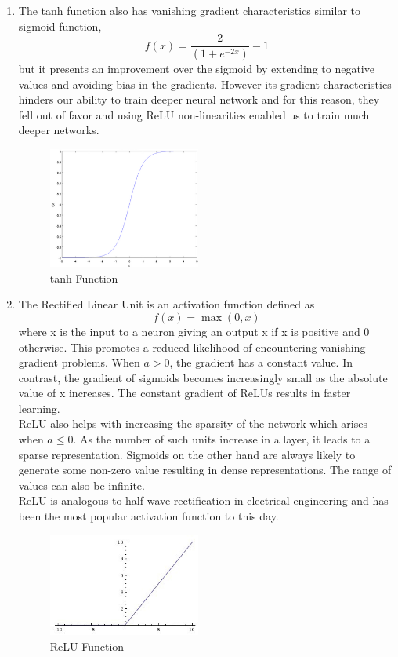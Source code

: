\begin{enumerate}[label=(\alph*)]
\item The tanh function also has vanishing gradient characteristics similar to sigmoid function,
\begin{equation}
    f(x) = \frac{2}{(1+e^{-2x})}-1
\end{equation}
but it presents an improvement over the sigmoid by extending to negative values and avoiding bias in the gradients. 
However its gradient characteristics hinders our ability to train deeper neural network and for this reason, they fell out of favor and using ReLU non-linearities enabled us to train much deeper networks. 

\begin{figure}[ht]
\centering
\includegraphics[width=50mm]{lectures/02-b/tanh_function.png}
\caption{tanh Function}
\label{fig:tanh}
\end{figure}

\item The Rectified Linear Unit is an activation function defined as 
\begin{equation}
    f(x) = \max (0,x)
\end{equation}
where x is the input to a neuron giving an output x if x is positive and 0 otherwise. 
This promotes a reduced likelihood of encountering vanishing gradient problems. When $a > 0$, the gradient has a constant value. 
In contrast, the gradient of sigmoids becomes increasingly small as the absolute value of x increases.
The constant gradient of ReLUs results in faster learning.\\

ReLU also helps with increasing the sparsity of the network which arises when $a ≤ 0$. 
As the number of such units increase in a layer, it leads to a sparse representation. 
Sigmoids on the other hand are always likely to generate some non-zero value resulting in dense representations. 
The range of values can also be infinite.\\

ReLU is analogous to half-wave rectification in electrical engineering and has been the most popular activation function to this day.

\begin{figure}[ht]
\centering
\includegraphics[width=50mm]{lectures/02-b/ReLU_function.jpg}
\caption{ReLU Function}
\label{fig:relu}
\end{figure}
\end{enumerate}

